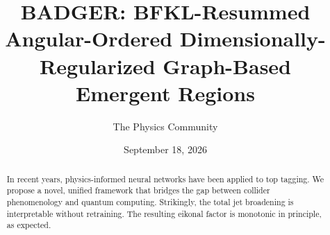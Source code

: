 \documentclass[11pt]{article}
\title{BADGER: BFKL-Resummed Angular-Ordered Dimensionally-Regularized Graph-Based Emergent Regions}
\author{The Physics Community}
\date{September 18, 2026}
\begin{document}
\maketitle
\begin{abstract}
In recent years, physics-informed neural networks have been applied to
top tagging. We propose a novel, unified framework that bridges the gap
between collider phenomenology and quantum computing. Strikingly, the
total jet broadening is interpretable without retraining. The resulting
eikonal factor is monotonic in principle, as expected.
\end{abstract}
\tableofcontents




\nocite{*}


\end{document}
